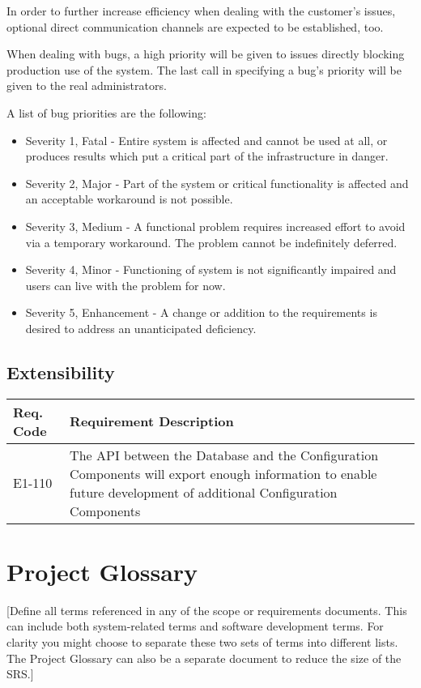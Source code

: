 \documentclass[12pt]{article}
\begin{document}
In order to further increase efficiency when dealing with the customer's issues,
optional direct communication channels are expected to be established, too.

When dealing with bugs, a high priority will be given to issues directly
blocking production use of the system.  The last call in specifying a bug's
priority will be given to the real administrators.

A list of bug priorities are the following:
\begin{itemize}
	\item Severity 1, Fatal - Entire system is affected and cannot be used at
        all, or produces results which put a critical part of the infrastructure
        in danger.
	\item Severity 2, Major - Part of the system or critical functionality is affected and an acceptable workaround is not possible.
	\item Severity 3, Medium - A functional problem requires increased effort to avoid via a temporary workaround. The problem cannot be indefinitely deferred.
	\item Severity 4, Minor - Functioning of system is not significantly impaired and users can live with the problem for now.
	\item Severity 5, Enhancement - A change or addition to the requirements is desired to address an unanticipated deficiency.
\end{itemize}


\subsection{Extensibility}

\begin{center}
	\begin{tabular}{| p{2.5cm} | p{12.5cm} |}
		\hline
		\textbf{Req. Code} & \textbf{Requirement Description}\\
		\hline
        E1-110	& The API between the Database and the Configuration Components
        will export enough information to enable future development of
        additional Configuration Components\\
		\hline
	\end{tabular}
	\label{tab:ExtensibilityRequirements}
\end{center}


\section{Project Glossary}
[Define all terms referenced in any of the scope or requirements documents. This can include both system-related terms and software 
development terms. For clarity you might choose to separate these two sets of terms into different lists. The Project Glossary can 
also be a separate document to reduce the size of the SRS.]
\end{document}
